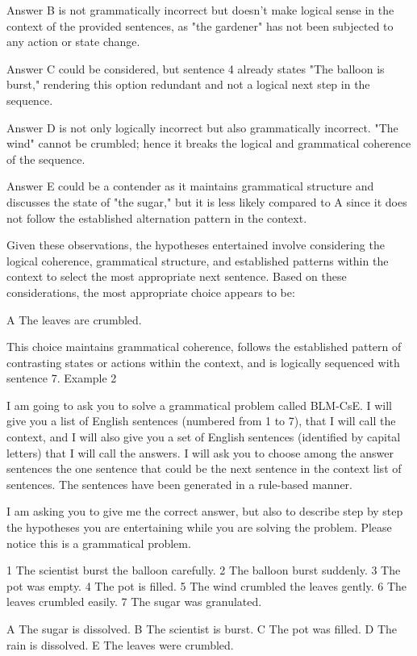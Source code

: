 Answer B is not grammatically incorrect but doesn't make logical sense in the context of the provided sentences, as "the gardener" has not been subjected to any action or state change.

Answer C could be considered, but sentence 4 already states "The balloon is burst," rendering this option redundant and not a logical next step in the sequence.

Answer D is not only logically incorrect but also grammatically incorrect. "The wind" cannot be crumbled; hence it breaks the logical and grammatical coherence of the sequence.

Answer E could be a contender as it maintains grammatical structure and discusses the state of "the sugar," but it is less likely compared to A since it does not follow the established alternation pattern in the context.

Given these observations, the hypotheses entertained involve considering the logical coherence, grammatical structure, and established patterns within the context to select the most appropriate next sentence. Based on these considerations, the most appropriate choice appears to be:

A The leaves are crumbled.

This choice maintains grammatical coherence, follows the established pattern of contrasting states or actions within the context, and is logically sequenced with sentence 7.
Example 2 

I am going to ask you to solve a grammatical problem called BLM-CsE.  I will give you a list of English sentences (numbered from 1 to 7), that I will call the context, and I will also give you a set of English sentences (identified by capital letters) that I will call  the answers. I will ask you to choose among the answer sentences the one sentence that could be the next sentence in the context list of sentences. The sentences have been generated in a rule-based manner. 

I am asking you to give me the correct answer, but also to describe step by step  the hypotheses you are entertaining while you are solving the problem. Please notice this is a grammatical problem.

1 The scientist burst the balloon carefully.
2 The balloon burst suddenly.
3 The pot was empty.
4 The pot is filled.
5 The wind crumbled the leaves gently.
6 The leaves crumbled easily.
7 The sugar was granulated.

A The sugar is dissolved.
B The scientist is burst.
C The pot was filled.
D The rain is dissolved.
E The leaves were crumbled.

